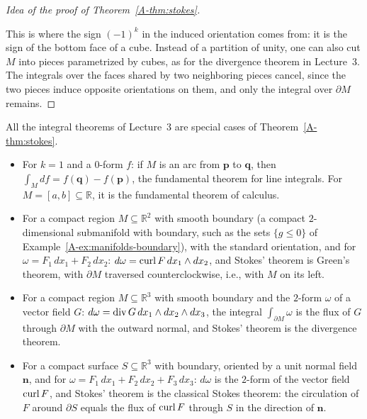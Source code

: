 \begin{proof}[Idea of the proof of Theorem~\ref{A-thm:stokes}]
\begin{enumerate}
    \end{enumerate}
    This is where the sign $(-1)^k$ in the induced orientation comes from: it is the sign of the bottom face of a cube. Instead of a partition of unity, one can also cut $M$ into pieces parametrized by cubes, as for the divergence theorem in Lecture~3. The integrals over the faces shared by two neighboring pieces cancel, since the two pieces induce opposite orientations on them, and only the integral over $\partial M$ remains.
\end{proof}

All the integral theorems of Lecture~3 are special cases of Theorem~\ref{A-thm:stokes}.
\begin{itemize}
    \item For $k = 1$ and a $0$-form $f$: if $M$ is an arc from $\mathbf{p}$ to $\mathbf{q}$, then $\int_M df = f(\mathbf{q}) - f(\mathbf{p})$, the fundamental theorem for line integrals. For $M = [a, b] \subseteq \mathbb{R}$, it is the fundamental theorem of calculus.
    \item For a compact region $M \subseteq \mathbb{R}^2$ with smooth boundary (a compact $2$-dimensional submanifold with boundary, such as the sets $\{g \leq 0\}$ of Example~\ref{A-ex:manifolds-boundary}), with the standard orientation, and for $\omega = F_1\, dx_1 + F_2\, dx_2$: $d\omega = \operatorname{curl} F\, dx_1 \wedge dx_2$, and Stokes' theorem is Green's theorem, with $\partial M$ traversed counterclockwise, i.e., with $M$ on its left.
    \item For a compact region $M \subseteq \mathbb{R}^3$ with smooth boundary and the $2$-form $\omega$ of a vector field $G$: $d\omega = \operatorname{div} G\, dx_1 \wedge dx_2 \wedge dx_3$, the integral $\int_{\partial M} \omega$ is the flux of $G$ through $\partial M$ with the outward normal, and Stokes' theorem is the divergence theorem.
    \item For a compact surface $S \subseteq \mathbb{R}^3$ with boundary, oriented by a unit normal field $\mathbf{n}$, and for $\omega = F_1\, dx_1 + F_2\, dx_2 + F_3\, dx_3$: $d\omega$ is the $2$-form of the vector field $\operatorname{curl} F$, and Stokes' theorem is the classical Stokes theorem: the circulation of $F$ around $\partial S$ equals the flux of $\operatorname{curl} F$ through $S$ in the direction of $\mathbf{n}$.
\end{itemize}

